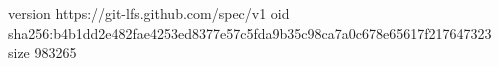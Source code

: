 version https://git-lfs.github.com/spec/v1
oid sha256:b4b1dd2e482fae4253ed8377e57c5fda9b35c98ca7a0c678e65617f217647323
size 983265

